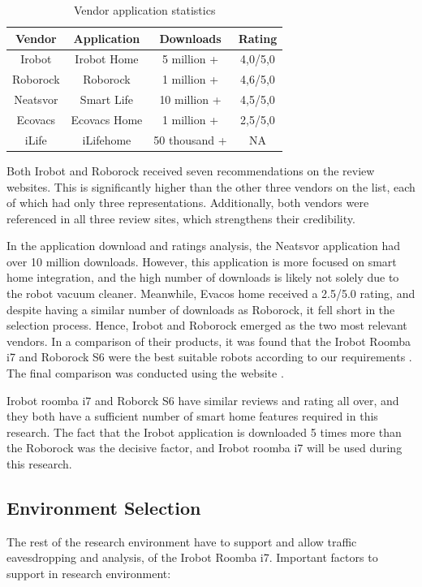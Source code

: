 \begin{table}[H]
\centering
\caption{Vendor application statistics}
\label{tab:VendorApplicationStat}
\begin{tabular}{|c|c|c|c|}
\hline
\textbf{Vendor} & \textbf{Application} & \textbf{Downloads} & \textbf{Rating} \\ \hline
Irobot          & Irobot Home          & 5 million +        & 4,0/5,0         \\ \hline
Roborock        & Roborock             & 1 million +        & 4,6/5,0         \\ \hline
Neatsvor        & Smart Life           & 10 million +       & 4,5/5,0         \\ \hline
Ecovacs         & Ecovacs Home         & 1 million +        & 2,5/5,0         \\ \hline
iLife           & iLifehome            & 50 thousand +      & NA              \\ \hline
\end{tabular}
\end{table}
Both Irobot and Roborock received seven recommendations on the review websites. This is significantly higher than the other three vendors on the list, each of which had only three representations. Additionally, both vendors were referenced in all three review sites, which strengthens their credibility. 

In the application download and ratings analysis, the Neatsvor application had over 10 million downloads. However, this application is more focused on smart home integration, and the high number of downloads is likely not solely due to the robot vacuum cleaner. Meanwhile, Evacos home received a 2.5/5.0 rating, and despite having a similar number of downloads as Roborock, it fell short in the selection process. Hence, Irobot and Roborock emerged as the two most relevant vendors. In a comparison of their products, it was found that the Irobot Roomba i7 and Roborock S6 were the best suitable robots according to our requirements \cite{robotsel8} \cite{robotsel6}. The final comparison was conducted using the website \cite{robotsel9}.

Irobot roomba i7 and Roborck S6 have similar reviews and rating all over, and they both have a sufficient number of smart home features required in this research. The fact that the Irobot application is downloaded 5 times more than the Roborock was the decisive factor, and Irobot roomba i7 will be used during this research. 

\subsection{Environment Selection}
The rest of the research environment have to support and allow traffic eavesdropping and analysis, of the Irobot Roomba i7.  Important factors to support in research environment:


